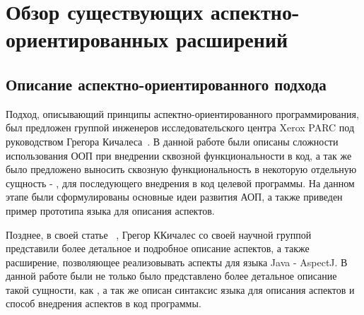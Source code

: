 \chapter{Обзор существующих аспектно-ориентированных расширений}

\section{Описание аспектно-ориентированного подхода}
Подход, описывающий принципы аспектно-ориентированного программирования, был
предложен группой инженеров исследовательского центра Xerox PARC под
руководством Грегора Кичалеса~\cite{kiczales_aop}.
В данной работе были описаны сложности использования ООП при внедрении сквозной
функциональности в код, а так же было предложено выносить сквозную
функциональность в некоторую отдельную сущность - , для
последующего внедрения в код целевой программы.
На данном этапе были сформулированы основные идеи развития АОП, а также приведен
пример прототипа языка для описания аспектов.

Позднее, в своей статье ~\cite{kiczales_aspectj},
Грегор ККичалес со своей научной группой представили более детальное и подробное
описание аспектов, а также расширение, позволяющее реализовывать аспекты для
языка Java - AspectJ.
В данной работе были не только было представлено более детальное описание такой
сущности, как , а так же описан синтаксис языка для описания
аспектов и способ внедрения аспектов в код программы.

